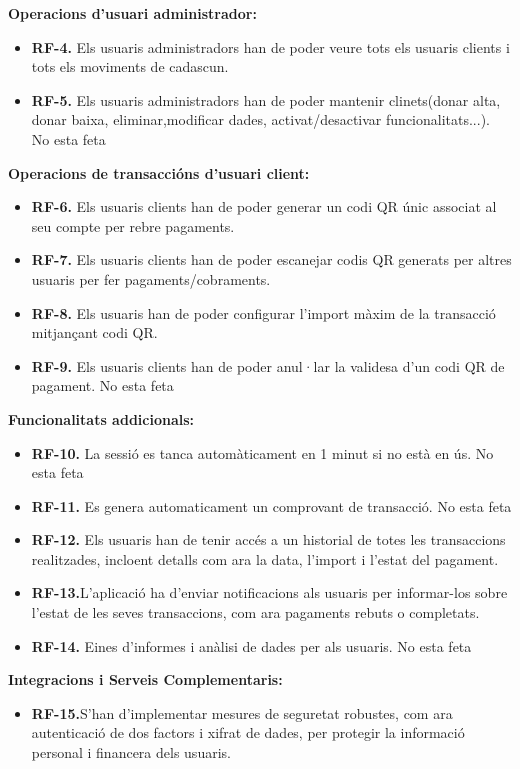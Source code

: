 \documentclass[a4paper,12pt,twoside]{ThesisStyle}
\begin{document}
\textbf{Operacions d'usuari administrador:}
\begin{itemize}
    \item \textbf{RF-4.} Els usuaris administradors han de poder veure tots els usuaris clients i tots els moviments de cadascun.
    \item \textbf{RF-5.} Els usuaris administradors han de poder mantenir clinets(donar alta, donar baixa, eliminar,modificar dades, activat/desactivar funcionalitats...). No esta feta
\end{itemize}


\textbf{Operacions de transaccións d'usuari client:}
\begin{itemize}
    \item \textbf{RF-6.} Els usuaris clients han de poder generar un codi QR únic associat al seu compte per rebre pagaments.
    \item \textbf{RF-7.} Els usuaris clients han de poder escanejar codis QR generats per altres usuaris per fer pagaments/cobraments.
    \item \textbf{RF-8.} Els usuaris han de poder configurar l'import màxim de la transacció mitjançant codi QR.
    \item \textbf{RF-9.} Els usuaris clients han de poder anul·lar la validesa d'un codi QR de pagament. No esta feta
\end{itemize}

\textbf{Funcionalitats addicionals:}
\begin{itemize}
    \item \textbf{RF-10.} La sessió es tanca automàticament en 1 minut si no està en ús. No esta feta
    \item \textbf{RF-11.} Es genera automaticament un comprovant de transacció. No esta feta
    \item \textbf{RF-12.} Els usuaris han de tenir accés a un historial de totes les transaccions realitzades, incloent detalls com ara la data, l'import i l'estat del pagament.
    \item \textbf{RF-13.}L'aplicació ha d'enviar notificacions als usuaris per informar-los sobre l'estat de les seves transaccions, com ara pagaments rebuts o completats.
    \item \textbf{RF-14.} Eines d'informes i anàlisi de dades per als usuaris. No esta feta
\end{itemize}


\textbf{Integracions i Serveis Complementaris:}
\begin{itemize}
        \item \textbf{RF-15.}S'han d'implementar mesures de seguretat robustes, com ara autenticació de dos factors i xifrat de dades, per protegir la informació personal i financera dels usuaris.
\end{itemize}
\end{document}
